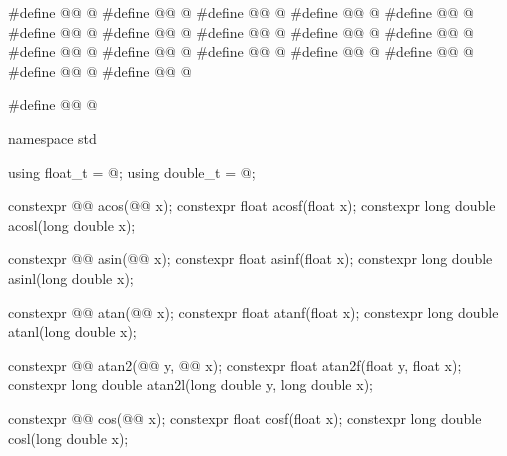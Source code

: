 %
%
%
%
%
%
%
%
%
%
%
%
%
%
%
%
%
\begin{codeblock}
#define @@ @\seebelow@
#define @@ @\seebelow@
#define @@ @\seebelow@
#define @@ @\seebelow@
#define @@ @\seebelow@
#define @@ @\seebelow@
#define @@ @\seebelow@
#define @@ @\seebelow@
#define @@ @\seebelow@
#define @@ @\seebelow@
#define @@ @\seebelow@
#define @@ @\seebelow@
#define @@ @\seebelow@
#define @@ @\seebelow@
#define @@ @\seebelow@
#define @@ @\seebelow@
#define @@ @\seebelow@

#define @@ @\seebelow@

namespace std {
  using float_t = @\seebelow@;
  using double_t = @\seebelow@;

  constexpr @@ acos(@@ x);
  constexpr float               acosf(float x);
  constexpr long double         acosl(long double x);

  constexpr @@ asin(@@ x);
  constexpr float               asinf(float x);
  constexpr long double         asinl(long double x);

  constexpr @@ atan(@@ x);
  constexpr float               atanf(float x);
  constexpr long double         atanl(long double x);

  constexpr @@ atan2(@@ y, @@ x);
  constexpr float               atan2f(float y, float x);
  constexpr long double         atan2l(long double y, long double x);

  constexpr @@ cos(@@ x);
  constexpr float               cosf(float x);
  constexpr long double         cosl(long double x);

}
\end{codeblock}
